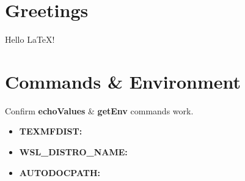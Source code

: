 \documentclass{article}%
\newcommand{\echoValues}[2]{%
    \textbf{#1:}%
    \newline%
    [#2]%
  }%
\begin{document}
%

\section{Greetings}
Hello \LaTeX!

\section{Commands \& Environment}\label{sec:side-effects}%
Confirm \textbf{echoValues} \& \textbf{getEnv} commands work.

\begin{itemize}%
  \item \echoValues{TEXMFDIST}{\texDist}%
  \item \echoValues{WSL\_DISTRO\_NAME}{\wsl}%
  \item \echoValues{AUTODOCPATH}{\autodocPath}%
\end{itemize}
\end{document}
